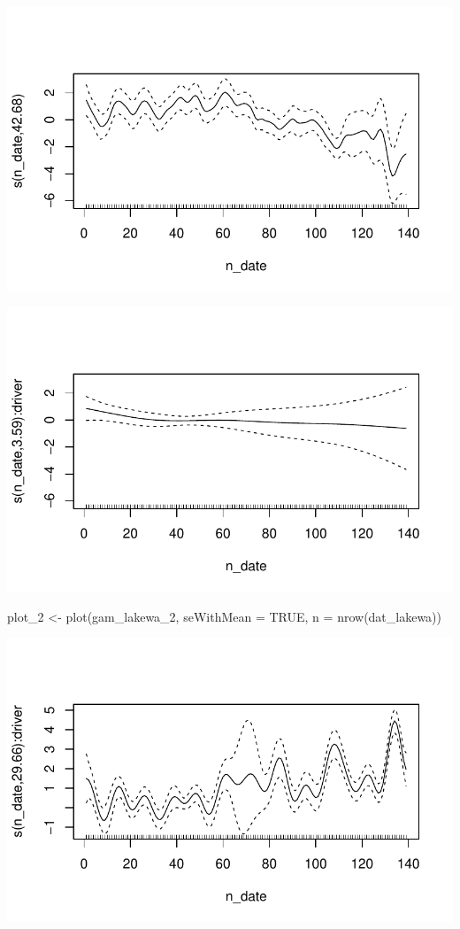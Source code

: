 \documentclass[
  letterpaper,
  DIV=11,
  numbers=noendperiod]{scrartcl}
\newenvironment{Shaded}{\begin{snugshade}}{\end{snugshade}}
\newcommand{\AttributeTok}[1]{\textcolor[rgb]{0.40,0.45,0.13}{#1}}
\newcommand{\ConstantTok}[1]{\textcolor[rgb]{0.56,0.35,0.01}{#1}}
\newcommand{\FunctionTok}[1]{\textcolor[rgb]{0.28,0.35,0.67}{#1}}
\newcommand{\NormalTok}[1]{\textcolor[rgb]{0.00,0.23,0.31}{#1}}
\newcommand{\OtherTok}[1]{\textcolor[rgb]{0.00,0.23,0.31}{#1}}
\begin{document}
\includegraphics{dlm_gam_comparison_files/figure-pdf/unnamed-chunk-5-1.pdf}

\includegraphics{dlm_gam_comparison_files/figure-pdf/unnamed-chunk-5-2.pdf}

\begin{Shaded}
\begin{Highlighting}[]
\NormalTok{plot\_2 }\OtherTok{\textless{}{-}} \FunctionTok{plot}\NormalTok{(gam\_lakewa\_2, }\AttributeTok{seWithMean =} \ConstantTok{TRUE}\NormalTok{, }\AttributeTok{n =} \FunctionTok{nrow}\NormalTok{(dat\_lakewa))}
\end{Highlighting}
\end{Shaded}

\includegraphics{dlm_gam_comparison_files/figure-pdf/unnamed-chunk-5-3.pdf}
\end{document}
